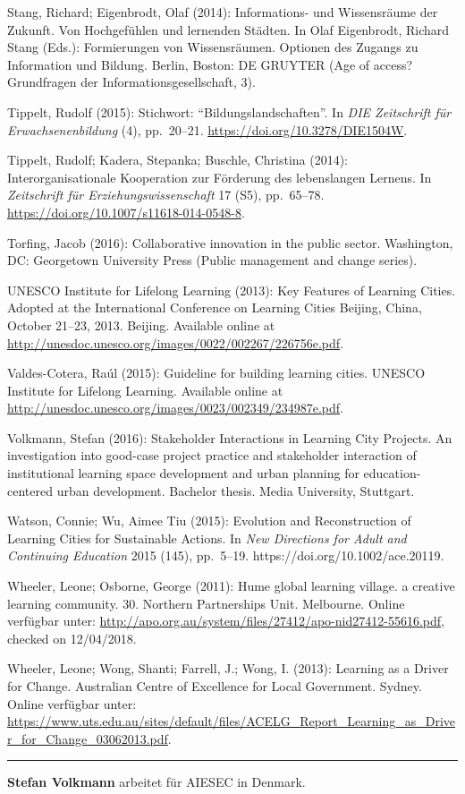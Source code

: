 \documentclass[a4paper,
fontsize=11pt,
oneside,
numbers=noperiodatend,
parskip=half-,
bibliography=totoc,
final
]{scrartcl}
\begin{document}
Stang, Richard; Eigenbrodt, Olaf (2014): Informations- und Wissensräume
der Zukunft. Von Hochgefühlen und lernenden Städten. In Olaf Eigenbrodt,
Richard Stang (Eds.): Formierungen von Wissensräumen. Optionen des
Zugangs zu Information und Bildung. Berlin, Boston: DE GRUYTER (Age of
access? Grundfragen der Informationsgesellschaft, 3).

Tippelt, Rudolf (2015): Stichwort: \enquote{Bildungslandschaften}. In
\emph{DIE Zeitschrift für Erwachsenenbildung} (4), pp.~20--21.
\url{https://doi.org/10.3278/DIE1504W}.

Tippelt, Rudolf; Kadera, Stepanka; Buschle, Christina (2014):
Interorganisationale Kooperation zur Förderung des lebenslangen Lernens.
In \emph{Zeitschrift für Erziehungswissenschaft} 17 (S5), pp.~65--78.
\url{https://doi.org/10.1007/s11618-014-0548-8}.

Torfing, Jacob (2016): Collaborative innovation in the public sector.
Washington, DC: Georgetown University Press (Public management and
change series).

UNESCO Institute for Lifelong Learning (2013): Key Features of Learning
Cities. Adopted at the International Conference on Learning Cities
Beijing, China, October 21--23, 2013. Beijing. Available online at
\url{http://unesdoc.unesco.org/images/0022/002267/226756e.pdf}.

Valdes-Cotera, Raúl (2015): Guideline for building learning cities.
UNESCO Institute for Lifelong Learning. Available online at
\url{http://unesdoc.unesco.org/images/0023/002349/234987e.pdf}.

Volkmann, Stefan (2016): Stakeholder Interactions in Learning City
Projects. An investigation into good-case project practice and
stakeholder interaction of institutional learning space development and
urban planning for education-centered urban development. Bachelor
thesis. Media University, Stuttgart.

Watson, Connie; Wu, Aimee Tiu (2015): Evolution and Reconstruction of
Learning Cities for Sustainable Actions. In \emph{New Directions for
Adult and Continuing Education} 2015 (145), pp.~5--19.
https://doi.org/10.1002/ace.20119.

Wheeler, Leone; Osborne, George (2011): Hume global learning village. a
creative learning community. 30. Northern Partnerships Unit. Melbourne.
Online verfügbar unter:
\url{http://apo.org.au/system/files/27412/apo-nid27412-55616.pdf},
checked on 12/04/2018.

Wheeler, Leone; Wong, Shanti; Farrell, J.; Wong, I. (2013): Learning as
a Driver for Change. Australian Centre of Excellence for Local
Government. Sydney. Online verfügbar unter:
\url{https://www.uts.edu.au/sites/default/files/ACELG_Report_Learning_as_Driver_for_Change_03062013.pdf}.

\begin{center}\rule{0.5\linewidth}{\linethickness}\end{center}

\textbf{Stefan Volkmann} arbeitet für AIESEC in Denmark.
\end{document}
